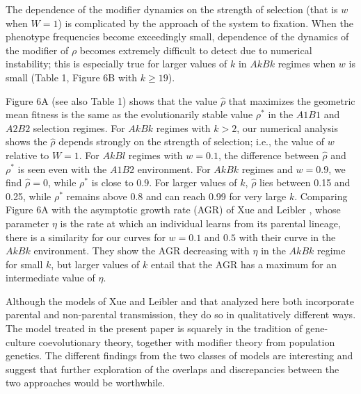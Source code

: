 \documentclass[9pt,twocolumn,twoside,lineno]{pnas-new}
\begin{document}
 The dependence of the modifier dynamics on the strength of selection (that is $w$ when $W=1$) is complicated by the approach of the system to fixation. When the phenotype frequencies become exceedingly small, dependence of the dynamics of the modifier of $\rho$ becomes extremely difficult to detect due to numerical instability; this is especially true for larger values of $k$ in $AkBk$ regimes when $w$ is small (Table 1, Figure 6B with $k\ge 19$).
 
 Figure 6A (see also Table 1) shows that the value $\hat\rho$ that maximizes the geometric mean fitness is the same as the evolutionarily stable value $\rho^*$ in the $A1B1$ and $A2B2$ selection regimes. For $AkBk$ regimes with $k>2$, our numerical analysis shows the $\hat\rho$ depends strongly on the strength of selection; i.e., the value of $w$ relative to $W=1$. For $AkBl$ regimes with $w=0.1$, the difference between $\hat\rho$ and $\rho^*$ is seen even with the $A1B2$ environment. For $AkBk$ regimes and $w=0.9$, we find $\hat\rho=0$, while $\rho^*$ is close to $0.9$. For larger values of $k$, $\hat\rho$ lies between 0.15 and 0.25, while $\rho^*$ remains above 0.8 and can reach 0.99 for very large $k$. Comparing Figure 6A with the asymptotic growth rate (AGR) of Xue and Leibler \cite{xue2016evolutionary}, whose parameter $\eta$ is the rate at which an individual learns from its parental lineage, there is a similarity for our curves for $w=0.1$ and $0.5$ with their curve in the $AkBk$ environment. They show the AGR decreasing with $\eta$ in the $AkBk$ regime for small $k$, but larger values of $k$ entail that the AGR has a maximum for an intermediate value of $\eta$.
 
 Although the models of Xue and Leibler \cite{xue2016evolutionary} and that analyzed here both incorporate parental and non-parental transmission, they do so in qualitatively different ways. The model treated in the present paper is squarely in the tradition of gene-culture coevolutionary theory, together with modifier theory from population genetics. The different findings from the two classes of models are interesting and suggest that further exploration of the overlaps and discrepancies between the two approaches would be worthwhile.
 

\end{document}
